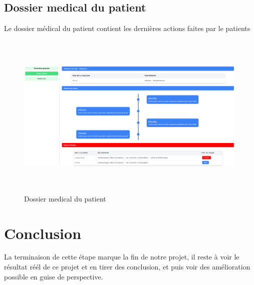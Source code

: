 \subsection{Dossier medical du patient}

Le dossier médical du patient contient les dernières actions faites par le patients

\begin{figure}[!h]
\begin{center}
\includegraphics[height=8cm,width=18cm]{med.png}
\end{center}
\caption{Dossier medical du patient}
\end{figure}






\section{Conclusion}
La terminaison de cette étape marque la fin de notre projet, il reste à voir le résultat réél de ce projet et en tirer des conclusion, et puis voir des amélioration possible en guise de perspective.

